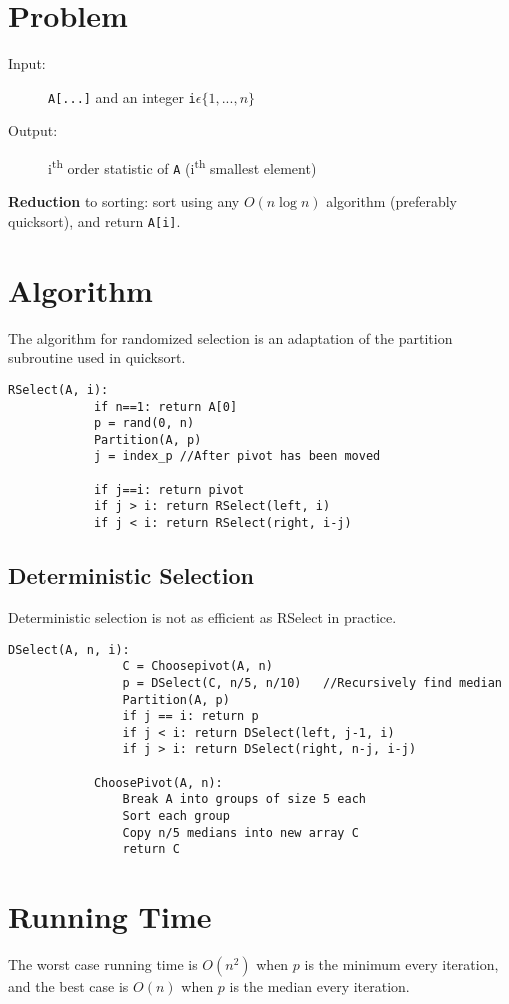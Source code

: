 \documentclass[11pt]{article}
\begin{document}
\section{Problem}
	\begin{description}
		\item[Input:] \verb|A[...]| and an integer \verb|i|$\epsilon \{1,...,n\}$
		\item[Output:] i\textsuperscript{th} order statistic of \verb|A| (i\textsuperscript{th} smallest element)
	\end{description}
	
	\textbf{Reduction} to sorting: sort using any $O(n\log n)$ algorithm (preferably quicksort), and return \verb|A[i]|.
	
\section{Algorithm}
	The algorithm for randomized selection is an adaptation of the partition subroutine used in quicksort.
	
	\begin{lstlisting}[autogobble=true]
		RSelect(A, i):
			if n==1: return A[0]
			p = rand(0, n)
			Partition(A, p)
			j = index_p	//After pivot has been moved
			
			if j==i: return pivot
			if j > i: return RSelect(left, i)
			if j < i: return RSelect(right, i-j)
	\end{lstlisting}
	
	\subsection{Deterministic Selection}
		Deterministic selection is not as efficient as RSelect in practice.
		\begin{lstlisting}[autogobble=true]
			DSelect(A, n, i):
				C = Choosepivot(A, n)
				p = DSelect(C, n/5, n/10)	//Recursively find median
				Partition(A, p)
				if j == i: return p
				if j < i: return DSelect(left, j-1, i)
				if j > i: return DSelect(right, n-j, i-j)
				
			ChoosePivot(A, n):
				Break A into groups of size 5 each
				Sort each group
				Copy n/5 medians into new array C
				return C
		\end{lstlisting}
	
\section{Running Time}
	The worst case running time is $O(n^2)$ when $p$ is the minimum every iteration, and the best case is $O(n)$ when $p$ is the median every iteration.
	
\end{document}
